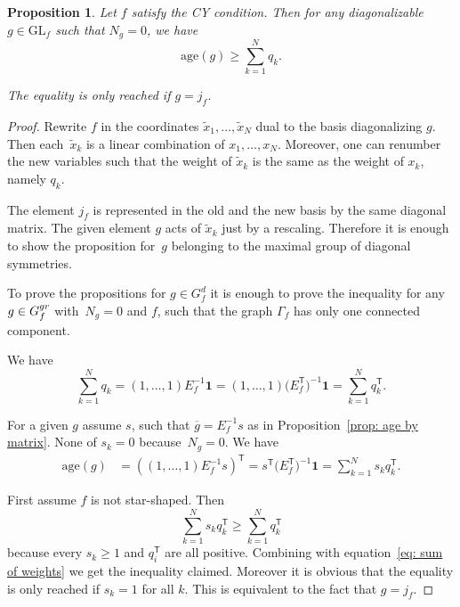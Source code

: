 \documentclass[10pt,a4paper]{article}
\numberwithin{equation}{section}
\newtheorem{Proposition}[Theorem]{Proposition}
 { \theoremstyle{definition}
\newtheorem{Definition}[Theorem]{Definition}
\newtheorem{Note}[Theorem]{Note}
\newtheorem{Example}[Theorem]{Example}
\newtheorem{Remark}[Theorem]{Remark} }
\newcommand{\GL}{{\mathrm{GL}}}
\newcommand{\age}{\mathrm{age}}
\begin{document}
\begin{Proposition}\label{prop: age greater than weights}
 Let $f$ satisfy the CY condition.
	Then for any diagonalizable $g \in \GL_f$ such that $N_g = 0$, we have
	\begin{equation*}
		\age(g) \ge \sum_{k=1}^N q_k.
	\end{equation*}

	The equality is only reached if $g = j_f$.
\end{Proposition}
\begin{proof}
Rewrite $f$ in the coordinates $\widetilde x_1,\dots,\widetilde x_N$ dual to the basis diagonalizing $g$. Then each~$\widetilde x_k$ is a linear combination of $x_1,\dots,x_N$. Moreover, one can renumber the new variables such that the weight of $\widetilde x_k$ is the same as the weight of $x_k$, namely $q_k$.

The element $j_f$ is represented in the old and the new basis by the same diagonal matrix. The given element $g$ acts of $\widetilde x_k$ just by a rescaling. Therefore it is enough to show the proposition for~$g$ belonging to the maximal group of diagonal symmetries.

To prove the propositions for $g \in G_f^d$ it is enough to prove the inequality for any $g \in G_f^{\rm gr}$ with~$N_g=0$ and $f$, such that the graph $\Gamma_f$ has only one connected component.

We have
\begin{equation}\label{eq: sum of weights}
	 \sum_{k=1}^N q_k = (1,\dots,1) E_f^{-1} \boldsymbol{1} = (1,\dots,1) \bigl(E_f^{\mathsf{T}}\bigr)^{-1} \boldsymbol{1} = \sum_{k=1}^N q_k^{\mathsf{T}}.
\end{equation}

For a given $g$ assume $s$, such that $\overline g = E_f^{-1}s$ as in Proposition~\ref{prop: age by matrix}. None of $s_k =0$ because~$N_g=0$. We have
\begin{align*}
	\age(g) &= ( (1,\dots,1) E_f^{-1} s )^{\mathsf{T}} = s^{\mathsf{T}} \bigl(E_f^{\mathsf{T}}\bigr)^{-1} \boldsymbol{1} = \sum_{k=1}^N s_k q_k^{\mathsf{T}}.
\end{align*}

First assume $f$ is not star-shaped. Then
\[
 \sum_{k=1}^N s_k q_k^{\mathsf{T}} \ge \sum_{k=1}^N q_k^{\mathsf{T}}
\]
because every $s_k \ge 1$ and $q_i^{\mathsf{T}}$ are all positive. Combining with equation~\eqref{eq: sum of weights} we get the inequality claimed. Moreover it is obvious that the equality is only reached if $s_k=1$ for all $k$. This is equivalent to the fact that $g = j_f$.


\end{proof}
\end{document}

